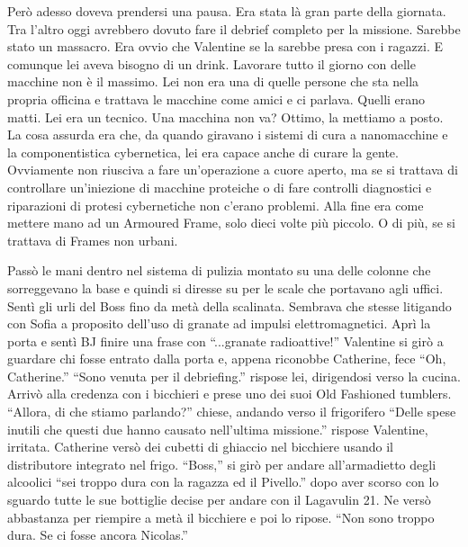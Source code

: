     Però adesso doveva prendersi una pausa. Era stata là gran parte della giornata. Tra l'altro oggi avrebbero dovuto
    fare il debrief completo per la missione. Sarebbe stato un massacro. Era ovvio che Valentine se la sarebbe presa con
    i ragazzi. E comunque lei aveva bisogno di un drink. Lavorare tutto il giorno con delle macchine non è il massimo.
    Lei non era una di quelle persone che sta nella propria officina e trattava le macchine come amici e ci parlava.
    Quelli erano matti. Lei era un tecnico. Una macchina non va? Ottimo, la mettiamo a posto. La cosa assurda era che,
    da quando giravano i sistemi di cura a nanomacchine e la componentistica cybernetica, lei era capace anche di curare
    la gente. Ovviamente non riusciva a fare un'operazione a cuore aperto, ma se si trattava di controllare un'iniezione
    di macchine proteiche o di fare controlli diagnostici e riparazioni di protesi cybernetiche non c'erano problemi.
    Alla fine era come mettere mano ad un Armoured Frame, solo dieci volte più piccolo. O di più, se si trattava di
    Frames non urbani.

    Passò le mani dentro nel sistema di pulizia montato su una delle colonne che sorreggevano la base e quindi si
    diresse su per le scale che portavano agli uffici. Sentì gli urli del Boss fino da metà della scalinata. Sembrava
    che stesse litigando con Sofia a proposito dell'uso di granate ad impulsi elettromagnetici. Aprì la porta e sentì
    BJ finire una frase con ``...granate radioattive!'' Valentine si girò a guardare chi fosse entrato dalla porta e,
    appena riconobbe Catherine, fece ``Oh, Catherine.'' ``Sono venuta per il debriefing.'' rispose lei, dirigendosi
    verso la cucina. Arrivò alla credenza con i bicchieri e prese uno dei suoi Old Fashioned tumblers. ``Allora, di che
    stiamo parlando?'' chiese, andando verso il frigorifero ``Delle spese inutili che questi due hanno causato
    nell'ultima missione.'' rispose Valentine, irritata. Catherine versò dei cubetti di ghiaccio nel bicchiere usando il
    distributore integrato nel frigo. ``Boss,'' si girò per andare all'armadietto degli alcoolici ``sei troppo dura con
    la ragazza ed il Pivello.'' dopo aver scorso con lo sguardo tutte le sue bottiglie decise per andare con il
    Lagavulin 21. Ne versò abbastanza per riempire a metà il bicchiere e poi lo ripose. ``Non sono troppo dura. Se ci
    fosse ancora Nicolas.''

